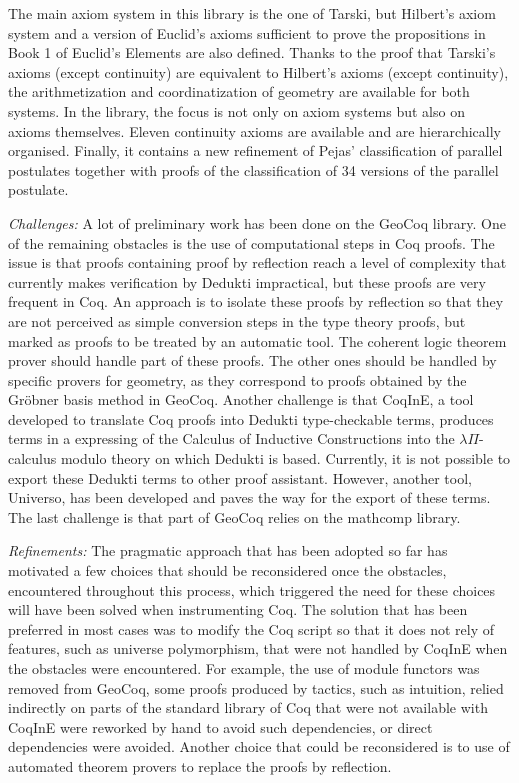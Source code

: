 The main axiom system in this library is the one of Tarski, but
Hilbert's axiom system and a version of Euclid's axioms sufficient to
prove the propositions in Book 1 of Euclid's Elements are also
defined. Thanks to the proof that Tarski's axioms (except continuity)
are equivalent to Hilbert's axioms (except continuity), the
arithmetization and coordinatization of geometry are available for
both systems. In the library, the focus is not only on axiom systems
but also on axioms themselves. Eleven continuity axioms are available
and are hierarchically organised. Finally, it contains a new
refinement of Pejas' classification of parallel postulates together
with proofs of the classification of 34 versions of the parallel
postulate.

\emph{Challenges:} A lot of preliminary work has been done on the
GeoCoq library.  One of the remaining obstacles is the use of
computational steps in Coq proofs. The issue is that proofs containing
proof by reflection reach a level of complexity that currently makes
verification by Dedukti impractical, but these proofs are very
frequent in Coq.  An approach is to isolate these proofs by
reflection so that they are not perceived as simple conversion steps
in the type theory proofs, but marked as proofs to be treated by an
automatic tool. The coherent logic theorem prover should handle part
of these proofs. The other ones should be handled by specific provers
for geometry, as they correspond to proofs obtained by the Gr\"obner
basis method in GeoCoq.  Another challenge is that CoqInE, a tool
developed to translate Coq proofs into Dedukti type-checkable terms,
produces terms in a expressing of the Calculus of Inductive
Constructions into the $\lambda \Pi$-calculus modulo theory on which
Dedukti is based. Currently, it is not possible to export these
Dedukti terms to other proof assistant. However, another tool,
Universo, has been developed and paves the way for the export of these
terms.  The last challenge is that part of GeoCoq relies on the
mathcomp library. 

\emph{Refinements:}
The pragmatic approach that has been adopted so far has motivated a
few choices that should be reconsidered once the obstacles,
encountered throughout this process, which triggered the need for
these choices will have been solved when instrumenting Coq. The solution that
has been preferred in most cases was to modify the Coq script so that
it does not rely of features, such as universe polymorphism, that were
not handled by CoqInE when the obstacles were encountered. For
example, the use of module functors was removed from GeoCoq, some
proofs produced by tactics, such as intuition, relied indirectly on
parts of the standard library of Coq that were not available with
CoqInE were reworked by hand to avoid such dependencies, or direct
dependencies were avoided. Another choice that could be reconsidered
is to use of automated theorem provers to replace the proofs by reflection.

